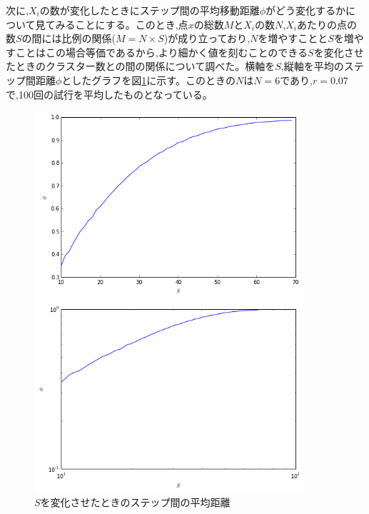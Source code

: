 次に,$X_{i}$の数が変化したときにステップ間の平均移動距離$\phi$がどう変化するかについて見てみることにする。このとき,点$x$の総数$M$と$X_{i}$の数$N$,$X_{i}$あたりの点の数$S$の間には比例の関係($M=N\times S$)が成り立っており,$N$を増やすことと$S$を増やすことはこの場合等価であるから,より細かく値を刻むことのできる$S$を変化させたときのクラスター数との間の関係について調べた。横軸を$S$,縦軸を平均のステップ間距離$\phi$としたグラフを図\ref{fig:f19}に示す。このときの$N$は$N=6$であり,$r=0.07$で,100回の試行を平均したものとなっている。
\begin{figure}[H]
    \begin{center}
        \includegraphics[width=10cm]{../img/S_phi_1.png}
        \caption{$S$を変化させたときのステップ間の平均距離}
        \label{fig:f19}
    \end{center}
\end{figure}
